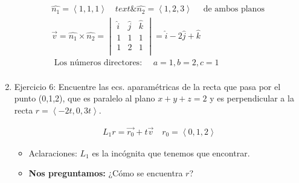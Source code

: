 \begin{enumerate}
\begin{itemize}
            \end{itemize}
            \begin{center}
                \begin{align*}
                    \hat{n_1} = \left\langle 1,1,1 \right\rangle \quad text{ \& } \hat{n_2} = \left\langle 1,2,3 \right\rangle \quad \text{  de ambos planos  }\\
                    \vec{v} = \hat{n_1} \times \hat{n_2} = \begin{vmatrix}
                        \hat{i} & \hat{j} & \hat{k} \\
                        1 & 1 & 1 \\ 
                        1 & 2 & 1 \\ 
                    \end{vmatrix}   = \hat{i} -2\hat{j} +\hat{k} \\ 
                    \text{  Los números directores:   } \quad a=1, b=2, c= 1 \\ 
                \end{align*}
            \end{center}
    
    \item Ejercicio 6: Encuentre las ecs. aparamétricas de la recta que pasa por el punto (0,1,2), que es paralelo al plano $x+y+z=2$ y es perpendicular a la recta $r = \left\langle -2t,0,3t \right\rangle $.
            \begin{center}
                \begin{align*}
                    L_1 r= \vec{r_0}+t \vec{v} \quad r_0 = \left\langle 0,1,2 \right\rangle 
                 \end{align*}
            \end{center}
            \begin{itemize}
                
                \item Aclaraciones: $L_1$ es la incógnita que tenemos que encontrar.
                \item \textbf{Nos preguntamos:} ¿Cómo se encuentra $r$?
                

\end{itemize}
\end{enumerate}
